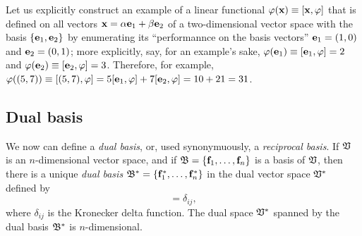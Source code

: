 {\color{blue}
\bexample
Let us explicitly construct an example of a linear functional $\varphi ({\bf x})\equiv [{\bf x},\varphi]$ that is defined
on all vectors ${\bf x}=
\alpha {\bf e}_1
+
\beta {\bf e}_2
$
of a two-dimensional vector space with the basis $\{{\bf e}_1, {\bf e}_2 \}$
by enumerating its ``performannce on the basis vectors''  ${\bf e}_1=(1,0)$ and ${\bf e}_2=(0,1)$;
more explicitly,  say, for an example's sake,
$\varphi ({\bf e}_1 ) \equiv [ {\bf e}_1,\varphi ] = 2$ and
$\varphi ({\bf e}_2 ) \equiv [ {\bf e}_2,\varphi ] = 3$.
Therefore, for example,
$\varphi ((5,7) ) \equiv [(5,7), \varphi ] = 5 [{\bf e}_1, \varphi ] + 7 [ {\bf e}_2,\varphi ]
=10+21=31$.
\eexample
}

\subsection{Dual basis}
\label{2011-m-Dualbasis}

We now can define a {\em dual basis}, or, used synonymuously, a {\em reciprocal basis}.
If ${\frak V}$ is an $n$-dimensional vector space, and if
${\frak B} = \{{\bf f}_1,\ldots , {\bf f}_n\}$
is a basis of  ${\frak V}$,
then there is a unique {\em dual basis}
${\frak B}^*
=\{{\bf f}_1^*,\ldots , {\bf f}_n^*\}$ in the dual vector space ${\frak V}^*$
defined by
\begin{equation}
[{\bf f}_i,  {\bf f}_j^*]=\delta_{ij},
\label{2011-m-Dualbasis-e1}
\end{equation}
where  $\delta_{ij}$
is the Kronecker delta function.
The dual space  ${\frak V}^*$ spanned by the dual basis ${\frak B}^*$ is $n$-dimensional.


